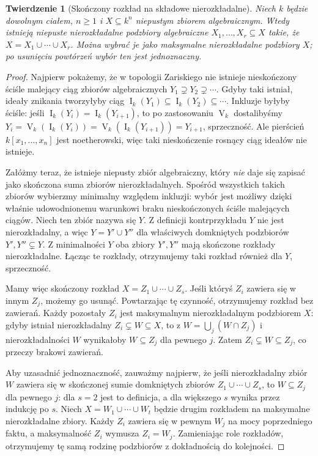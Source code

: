 \documentclass[11pt,a4paper,openany]{report}
\numberwithin{equation}{section}
\theoremstyle{plain}
\newtheorem{twierdzenie}{Twierdzenie}[section]
\theoremstyle{definition}
\theoremstyle{remark}
\newcommand{\V}{\operatorname V}
\newcommand{\I}{\operatorname I}
\begin{document}
\begin{twierdzenie}[Skończony rozkład na składowe nierozkładalne]
\label{tw:finite-components}
Niech $k$ będzie dowolnym ciałem, $n\ge1$ i
$X\subseteq k^n$ niepustym zbiorem algebraicznym.
Wtedy istnieją niepuste nierozkładalne podzbiory
algebraiczne $X_1,\dots,X_r\subseteq X$ takie, że
$X=X_1\cup\cdots\cup X_r$.
Można wybrać je jako \emph{maksymalne nierozkładalne podzbiory}
$X$; po usunięciu powtórzeń wybór ten jest jednoznaczny.
\end{twierdzenie}
\begin{proof}
Najpierw pokażemy, że w topologii Zariskiego nie istnieje
nieskończony ściśle malejący ciąg zbiorów algebraicznych
$Y_1\supsetneq Y_2\supsetneq\cdots$.
Gdyby taki istniał, ideały znikania tworzyłyby ciąg
$\I_k(Y_1)\subseteq\I_k(Y_2)\subseteq\cdots$.
Inkluzje byłyby ściśle: jeśli $\I_k(Y_i)=\I_k(Y_{i+1})$,
to po zastosowaniu $\V_k$ dostalibyśmy
$Y_i=\V_k(\I_k(Y_i))=\V_k(\I_k(Y_{i+1}))=Y_{i+1}$,
sprzeczność. Ale pierścień $k[x_1,\dots,x_n]$ jest noetherowski,
więc taki nieskończenie rosnący ciąg ideałów nie istnieje.

Załóżmy teraz, że istnieje niepusty zbiór algebraiczny,
który \emph{nie} daje się zapisać jako skończona suma zbiorów
nierozkładalnych. Spośród wszystkich takich zbiorów wybierzmy
minimalny względem inkluzji: wybór jest możliwy dzięki
właśnie udowodnionemu warunkowi braku nieskończonych ściśle
malejących ciągów. Niech ten zbiór nazywa się $Y$.
Z definicji kontrprzykładu $Y$ nie jest nierozkładalny,
a więc $Y=Y'\cup Y''$ dla właściwych domkniętych
podzbiorów $Y',Y''\subsetneq Y$.
Z minimalności $Y$ oba zbiory $Y',Y''$ mają skończone
rozkłady nierozkładalne. Łącząc te rozkłady, otrzymujemy
taki rozkład również dla $Y$, sprzeczność.

Mamy więc skończony rozkład $X=Z_1\cup\cdots\cup Z_s$.
Jeśli któryś $Z_i$ zawiera się w innym $Z_j$, możemy go usunąć.
Powtarzając tę czynność, otrzymujemy rozkład bez zawierań.
Każdy pozostały $Z_i$ jest maksymalnym nierozkładalnym
podzbiorem $X$: gdyby istniał nierozkładalny
$Z_i\subsetneq W\subseteq X$, to z
$W=\bigcup_j(W\cap Z_j)$ i nierozkładalności $W$
wynikałoby $W\subseteq Z_j$ dla pewnego $j$.
Zatem $Z_i\subsetneq W\subseteq Z_j$, co przeczy brakowi zawierań.

Aby uzasadnić jednoznaczność, zauważmy najpierw, że jeśli
nierozkładalny zbiór $W$ zawiera się w skończonej sumie
domkniętych zbiorów $Z_1\cup\cdots\cup Z_s$,
to $W\subseteq Z_j$ dla pewnego $j$: dla $s=2$ jest to definicja,
a dla większego $s$ wynika przez indukcję po $s$.
Niech $X=W_1\cup\cdots\cup W_t$ będzie drugim rozkładem
na maksymalne nierozkładalne zbiory. Każdy $Z_i$ zawiera się
w pewnym $W_j$ na mocy poprzedniego faktu, a maksymalność
$Z_i$ wymusza $Z_i=W_j$. Zamieniając role rozkładów,
otrzymujemy tę samą rodzinę podzbiorów z dokładnością
do kolejności.
\end{proof}
\end{document}
